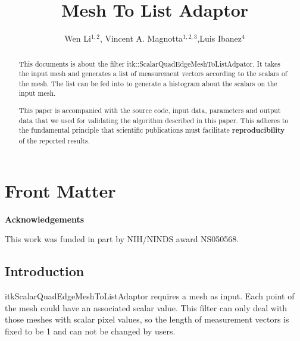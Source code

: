 \documentclass{InsightArticle}
\title{Mesh To List Adaptor}
\author{Wen Li$^{1,2}$, Vincent A. Magnotta$^{1,2,3}$,Luis Ibanez$^{4}$}
\makeatletter
\newcommand\ackname{Acknowledgements}
\newenvironment{acknowledgements}{%
      \titlepage
      \null\vfil
      \@beginparpenalty\@lowpenalty
      \begin{center}%
        \bfseries \ackname
        \@endparpenalty\@M
      \end{center}}%
     {\par\vfil\null\endtitlepage}
\newenvironment{acknowledgements}{%
      \if@twocolumn
        \section*{\abstractname}%
      \else
        \small
        \begin{center}%
          {\bfseries \ackname\vspace{-.5em}\vspace{\z@}}%
        \end{center}%
        \quotation
      \fi}
      {\if@twocolumn\else\endquotation\fi}
\newcommand{\IJhandlerIDnumber}{3117}
\makeatother
\begin{document}
%
% 
\IJhandlefooter{\IJhandlerIDnumber}


\ifpdf
\else
\fi


\maketitle


\ifhtml
\chapter*{Front Matter\label{front}}
\fi


\begin{abstract}
 
This documents is about the filter itk::ScalarQuadEdgeMeshToListAdpator. It takes 
the input mesh and generates a list of measurement vectors according to 
the scalars of the mesh. The list can be fed into 
 to generate a histogram
about the scalars on the input mesh.

This paper is accompanied with the source code, input data, parameters and
output data that we used for validating the algorithm described in this paper.
This adheres to the fundamental principle that scientific publications must
facilitate \textbf{reproducibility} of the reported results.
\end{abstract}

\begin{acknowledgements}
This work was funded in part by NIH/NINDS award NS050568.
\end{acknowledgements}

\tableofcontents

\section{Introduction}
itkScalarQuadEdgeMeshToListAdaptor requires a mesh as input. Each point of the mesh
could have an associated scalar value. This filter can only deal with those meshes with
scalar pixel values, so the length of measurement vectors is fixed to be 1 and can not
be changed by users.
\end{document}
